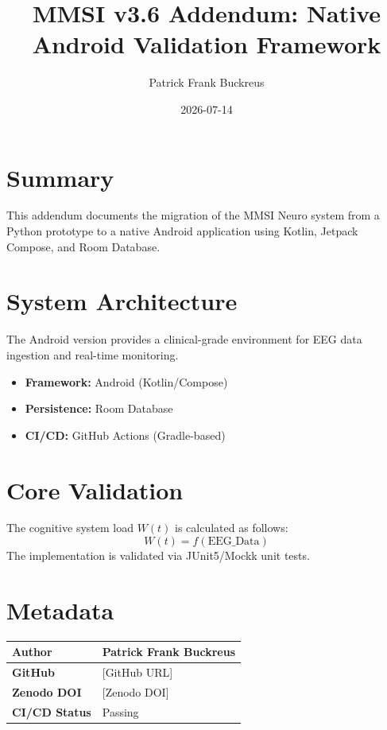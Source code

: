 \documentclass{article}
\title{MMSI v3.6 Addendum: Native Android Validation Framework}
\author{Patrick Frank Buckreus}
\date{2026-07-14}
\begin{document}
\maketitle

\section{Summary}
This addendum documents the migration of the MMSI Neuro system from a Python prototype to a native Android application using Kotlin, Jetpack Compose, and Room Database.

\section{System Architecture}
The Android version provides a clinical-grade environment for EEG data ingestion and real-time monitoring.
\begin{itemize}
    \item \textbf{Framework:} Android (Kotlin/Compose)
    \item \textbf{Persistence:} Room Database
    \item \textbf{CI/CD:} GitHub Actions (Gradle-based)
\end{itemize}

\section{Core Validation}
The cognitive system load $W(t)$ is calculated as follows:
\begin{equation}
    W(t) = f(\text{EEG\_Data})
\end{equation}
The implementation is validated via JUnit5/Mockk unit tests.

\section{Metadata}
\begin{tabular}{|l|l|}
    \hline
    \textbf{Author} & Patrick Frank Buckreus \\
    \hline
    \textbf{GitHub} & [GitHub URL] \\
    \hline
    \textbf{Zenodo DOI} & [Zenodo DOI] \\
    \hline
    \textbf{CI/CD Status} & Passing \\
    \hline
\end{tabular}
\end{document}
